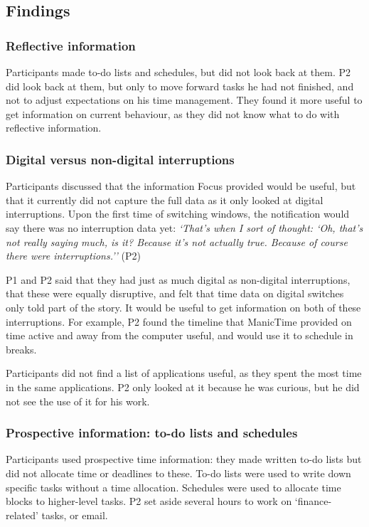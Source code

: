 
\subsection{Findings}
\subsubsection{Reflective information}
Participants made to-do lists and schedules, but did not look back at them. P2 did look back at them, but only to move forward tasks he had not finished, and not to adjust expectations on his time management. They found it more useful to get information on current behaviour, as they did not know what to do with reflective information. 

\subsubsection{Digital versus non-digital interruptions}
Participants discussed that the information Focus provided would be useful, but that it currently did not capture the full data as it only looked at digital interruptions. Upon the first time of switching windows, the notification would say there was no interruption data yet: \textit{`That's when I sort of thought: `Oh, that's not really saying much, is it? Because it's not actually true. Because of course there were interruptions.''} (P2)

P1 and P2 said that they had just as much digital as non-digital interruptions, that these were equally disruptive, and felt that time data on digital switches only told part of the story. It would be useful to get information on both of these interruptions.
For example, P2 found the timeline that ManicTime provided on time active and away from the computer useful, and would use it to schedule in breaks.  

Participants did not find a list of applications useful, as they spent the most time in the same applications. P2 only looked at it because he was curious, but he did not see the use of it for his work. 

\subsubsection{Prospective information: to-do lists and schedules}
Participants used prospective time information: they made written to-do lists but did not allocate time or deadlines to these. To-do lists were used to write down specific tasks without a time allocation. Schedules were used to allocate time blocks to higher-level tasks. P2 set aside several hours to work on `finance-related' tasks, or email.

